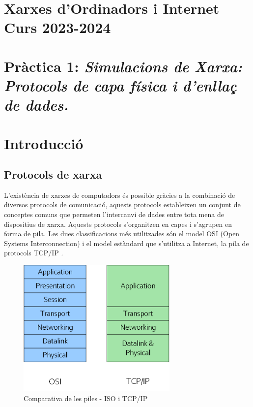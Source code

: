 \documentclass[12pt,a4paper]{article}
\begin{document}
\section*{Xarxes d’Ordinadors i Internet \\ Curs 2023-2024}
\section*{Pràctica 1: \textit{Simulacions de Xarxa: Protocols de capa física i d'enllaç de dades.}}

\vspace*{0.5cm}
\section{Introducció}


\subsection*{Protocols de xarxa}
L'existència de xarxes de computadors és possible gràcies a la combinació de diversos protocols de comunicació, aquests protocols estableixen un conjunt de conceptes comuns que permeten l'intercanvi de dades entre tota mena de dispositius de xarxa. Aquests protocols s'organitzen en capes i s'agrupen en forma de pila. Les dues classificacions més utilitzades són el model OSI (Open Systems Interconnection) \cite{osi} i el model estàndard que s'utilitza a Internet, la pila de protocols TCP/IP \cite{internet}.

\begin{figure}[!ht]
  \begin{center}
    \includegraphics[width=0.7\textwidth]{protocol-stack}
    \caption{Comparativa de les piles - ISO i TCP/IP}
    \label{osi-stack}
  \end{center}
\end{figure}
\end{document}
